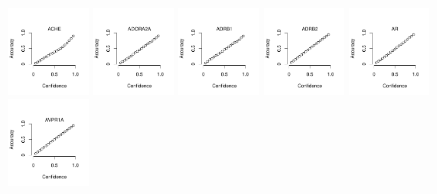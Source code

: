 \documentclass[utf8]{frontiersSCNS} %
\begin{document}
\begin{figure}[h!]

\vspace*{-15pt} %
\includegraphics[width=0.19\textwidth]{figures/calibration_plots/ache_calib.pdf}
\includegraphics[width=0.19\textwidth]{figures/calibration_plots/adora2a_calib.pdf}
\includegraphics[width=0.19\textwidth]{figures/calibration_plots/adrb1_calib.pdf}
\includegraphics[width=0.19\textwidth]{figures/calibration_plots/adrb2_calib.pdf}
\includegraphics[width=0.19\textwidth]{figures/calibration_plots/ar_calib.pdf}
\vspace*{-15pt} %
\includegraphics[width=0.19\textwidth]{figures/calibration_plots/avpr1a_calib.pdf}

\end{figure}
\end{document}

